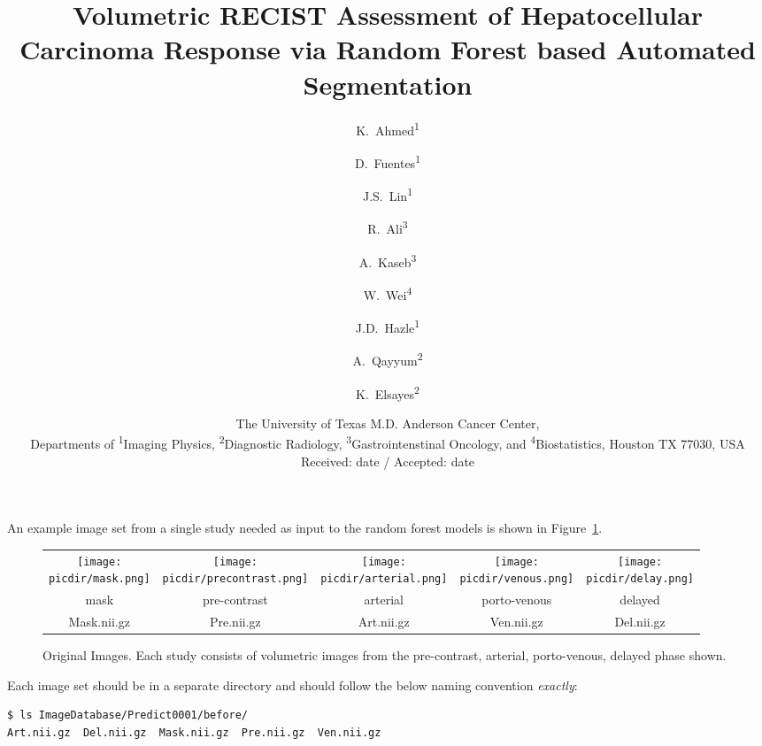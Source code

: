 \documentclass[10pt]{amsart}
\title[Volumetric RECIST Assessment of HCC Response via RF-based Automated Segmentation]{Volumetric RECIST Assessment of Hepatocellular Carcinoma Response 
via Random Forest based Automated Segmentation 
}
\author{K.~Ahmed\textsuperscript{1} \and
        D.~Fuentes\textsuperscript{1} \and
        J.S.~Lin\textsuperscript{1} \and
        R.~Ali\textsuperscript{3} \and
        A.~Kaseb\textsuperscript{3} \and
        W.~Wei\textsuperscript{4} \and
        J.D.~Hazle\textsuperscript{1} \and
        A.~Qayyum\textsuperscript{2} \and
        K.~Elsayes\textsuperscript{2} 
}
\date{ \small
The University of Texas M.D. Anderson Cancer Center,\\
Departments of \textsuperscript{1}Imaging Physics, \textsuperscript{2}Diagnostic Radiology,
\textsuperscript{3}Gastrointenstinal Oncology,
and \textsuperscript{4}Biostatistics, Houston TX 77030, USA \\
Received: date / Accepted: date
}
\newif\iflatextortf
\newcommand{\picdir}{./pdffig}
\begin{document}
 An example image set from a single study needed as input to the random
forest models is shown in Figure~\ref{Fig:OriginalImages}.

\begin{figure}[h] 
\iflatextortf 
\else
\begin{tabular}{ccccc} 
  \scalebox{0.40}{\texttt{[image: \\picdir/mask.png]}}
& \scalebox{0.40}{\texttt{[image: \\picdir/precontrast.png]}}
& \scalebox{0.40}{\texttt{[image: \\picdir/arterial.png]}   }
& \scalebox{0.40}{\texttt{[image: \\picdir/venous.png]}     }
& \scalebox{0.40}{\texttt{[image: \\picdir/delay.png]}      }
\\
mask & pre-contrast & arterial & porto-venous & delayed 
\\
Mask.nii.gz & Pre.nii.gz &  Art.nii.gz & Ven.nii.gz & Del.nii.gz  
\\ 
\end{tabular}           
\fi
\caption{Original Images. Each study consists of volumetric images from the
pre-contrast, arterial, porto-venous, delayed phase shown. 
}\label{Fig:OriginalImages}
\end{figure}  

Each image set should be in a separate directory and should follow
the below naming convention \textit{exactly}:
\begin{verbatim}
$ ls ImageDatabase/Predict0001/before/
Art.nii.gz  Del.nii.gz  Mask.nii.gz  Pre.nii.gz  Ven.nii.gz
\end{verbatim}
\end{document}
